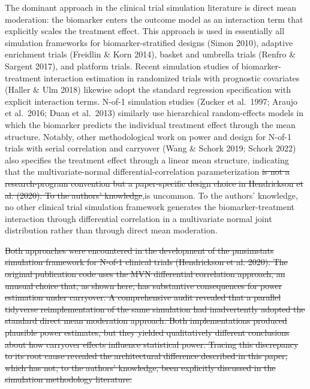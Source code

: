 \documentclass[
]{article}
\begin{document}
The dominant approach in the clinical trial simulation literature
is direct mean moderation: the biomarker enters the outcome model
as an interaction term that explicitly scales the treatment effect.
This approach is used in essentially all simulation frameworks for
biomarker-stratified designs (Simon 2010), adaptive enrichment
trials (Freidlin \& Korn 2014), basket and umbrella trials (Renfro
\& Sargent 2017), and platform trials. Recent simulation studies
of biomarker-treatment interaction estimation in randomized trials
with prognostic covariates (Haller \& Ulm 2018) likewise adopt
the standard regression specification with explicit interaction
terms. N-of-1 simulation studies (Zucker et al.~1997; Araujo
et al.~2016; Duan et al.~2013) similarly use hierarchical
random-effects models in which the biomarker predicts the
individual treatment effect through the mean structure. Notably,
other methodological work on power and design for N-of-1 trials
with serial correlation and carryover (Wang \& Schork 2019;
Schork 2022) also specifies the treatment effect through a linear
mean structure, indicating that the multivariate-normal
differential-correlation parameterization \textcolor{delred}{\sout{is not a research-program convention but a paper-specific design choice in Hendrickson et al. (2020). To the authors' knowledge}},\textcolor{addblue}{is uncommon. To the authors' knowledge}, no other clinical trial
simulation framework generates the biomarker-treatment interaction
through differential correlation in a multivariate normal joint
distribution rather than through direct mean moderation.

\textcolor{delred}{\sout{Both approaches were encountered in the development of the pmsimstats simulation framework for N-of-1 clinical trials (Hendrickson et al. 2020). The original publication code uses the MVN differential correlation approach, an unusual choice that, as shown here, has substantive consequences for power estimation under carryover. A comprehensive audit revealed that a parallel tidyverse reimplementation of the same simulation had inadvertently adopted the standard direct mean moderation approach. Both implementations produced plausible power estimates, but they yielded qualitatively different conclusions about how carryover effects influence statistical power. Tracing this discrepancy to its root cause revealed the architectural difference described in this paper, which has not, to the authors' knowledge, been explicitly discussed in the simulation methodology literature.}}
\end{document}
